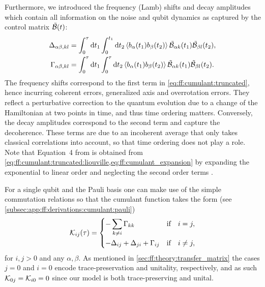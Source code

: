 Furthermore, we introduced the frequency (Lamb) shifts \freqshifts and decay amplitudes \decayamps which contain all information on the noise and qubit dynamics as captured by the control matrix $\tilde{\mathcal{B}}(t)$:
\begin{align}
    \Delta_{\alpha\beta,kl} &= \int_0^\tau\dd{t_1}\int_0^{t_1}\dd{t_2}\expval{b_\alpha(t_1) b_\beta(t_2)}\tilde{\mathcal{B}}_{\alpha k}(t_1)\tilde{\mathcal{B}}_{\beta l}(t_2), \label{eq:ff:frequency_shifts:time} \\
    \Gamma_{\alpha\beta,kl} &= \int_0^\tau\dd{t_1}\int_0^\tau\dd{t_2}\expval{b_\alpha(t_1) b_\beta(t_2)}\tilde{\mathcal{B}}_{\alpha k}(t_1)\tilde{\mathcal{B}}_{\beta l}(t_2).  \label{eq:ff:decay_amplitudes:time}
\end{align}
The frequency shifts \freqshifts correspond to the first term in \cref{eq:ff:cumulant:truncated}, hence incurring coherent errors, \ie generalized axis and overrotation errors.
They reflect a perturbative correction to the quantum evolution due to a change of the Hamiltonian at two points in time, and thus time ordering matters.
Conversely, the decay amplitudes \decayamps correspond to the second term and capture the decoherence.
These terms are due to an incoherent average that only takes classical correlations into account, so that time ordering does not play a role.
Note that Equation~4 from  is obtained from \cref{eq:ff:cumulant:truncated:liouville,eq:ff:cumulant_expansion} by expanding the exponential to linear order and neglecting the second order terms \freqshifts.

For a single qubit and \basis the Pauli basis one can make use of the simple commutation relations so that the cumulant function takes the form (see \cref{subsec:app:ff:derivations:cumulant:pauli})
\begin{equation}\label{eq:ff:cumulant:truncated:liouville:pauli}
\cumulantfun_{ij}(\tau) = \begin{dcases}
    - \sum_{k\neq i}\decayamps_{kk}                         &\qif* i = j,   \\
    - \freqshifts_{ij} + \freqshifts_{ji} + \decayamps_{ij} &\qif* i\neq j,
\end{dcases}
\end{equation}
for $i,j > 0$ and any $\alpha,\beta$.
As mentioned in \cref{sec:ff:theory:transfer_matrix} the cases $j = 0$ and $i = 0$ encode trace-preservation and unitality, respectively, and as such $\mathcal{K}_{0j} = \mathcal{K}_{i0} = 0$ since our model is both trace-preserving and unital.

